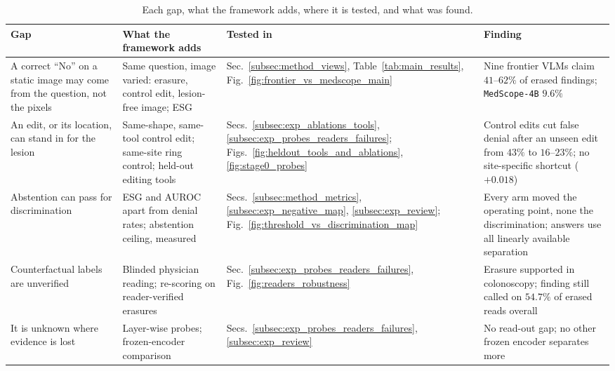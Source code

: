 \documentclass{article} %
\begin{document}
\begin{table}[t]
\caption{Each gap, what the framework adds, where it is tested, and what was found.}
\label{tab:gap_map}
\begin{center}
\small
\begin{adjustbox}{max width=\linewidth}
\begin{tabular}{L{3.4cm}L{3.7cm}L{2.5cm}L{4.6cm}}
\toprule
\textbf{Gap} & \textbf{What the framework adds} & \textbf{Tested in} & \textbf{Finding} \\
\midrule
A correct ``No'' on a static image may come from the question, not the pixels & Same question, image varied: erasure, control edit, lesion-free image; ESG & Sec.~\ref{subsec:method_views}, Table~\ref{tab:main_results}, Fig.~\ref{fig:frontier_vs_medscope_main} & Nine frontier VLMs claim $41$--$62\%$ of erased findings; \texttt{MedScope-4B} $9.6\%$ \\
An edit, or its location, can stand in for the lesion & Same-shape, same-tool control edit; same-site ring control; held-out editing tools & Secs.~\ref{subsec:exp_ablations_tools}, \ref{subsec:exp_probes_readers_failures}; Figs.~\ref{fig:heldout_tools_and_ablations}, \ref{fig:stage0_probes} & Control edits cut false denial after an unseen edit from $43\%$ to $16$--$23\%$; no site-specific shortcut ($+0.018$) \\
Abstention can pass for discrimination & ESG and AUROC apart from denial rates; abstention ceiling, measured & Secs.~\ref{subsec:method_metrics}, \ref{subsec:exp_negative_map}, \ref{subsec:exp_review}; Fig.~\ref{fig:threshold_vs_discrimination_map} & Every arm moved the operating point, none the discrimination; answers use all linearly available separation \\
Counterfactual labels are unverified & Blinded physician reading; re-scoring on reader-verified erasures & Sec.~\ref{subsec:exp_probes_readers_failures}, Fig.~\ref{fig:readers_robustness} & Erasure supported in colonoscopy; finding still called on $54.7\%$ of erased reads overall \\
It is unknown where evidence is lost & Layer-wise probes; frozen-encoder comparison & Secs.~\ref{subsec:exp_probes_readers_failures}, \ref{subsec:exp_review} & No read-out gap; no other frozen encoder separates more \\
\bottomrule
\end{tabular}
\end{adjustbox}
\end{center}
\end{table}
\end{document}

